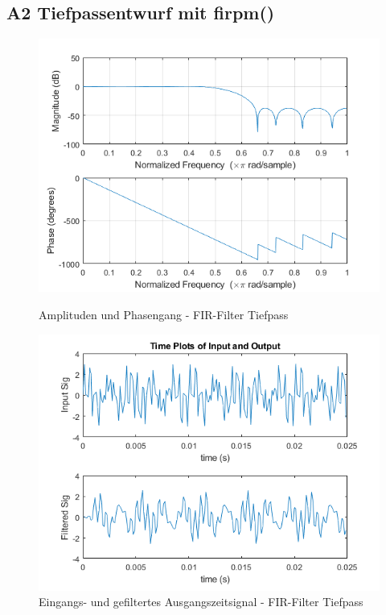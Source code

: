 \newpage

\subsection{A2 Tiefpassentwurf mit firpm()}





\clearpage

\begin{figure}[h]
\centering
\includegraphics[width=0.7\linewidth]{./Bilder/Attachment_A2_fir_2b_Amplitudengang}
\caption{Amplituden und Phasengang - FIR-Filter Tiefpass}
\label{fig:Attachment_A2_fir_2b_Amplitudengang}
\vspace*{30mm}
\centering
\includegraphics[width=0.7\linewidth]{./Bilder/Attachment_A2_fir_2b_Timeplot}
\caption{Eingangs- und gefiltertes Ausgangszeitsignal  - FIR-Filter Tiefpass}
\label{fig:Attachment_A2_fir_2b_Timeplot}
\end{figure}

